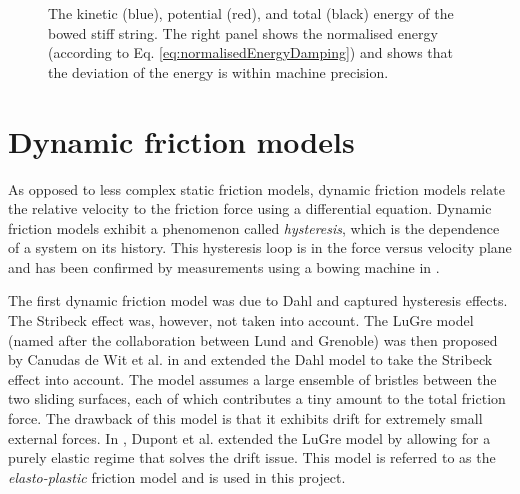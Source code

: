 \begin{figure}[h]
    \centering
      \caption{The kinetic (blue), potential (red), and total (black) energy of the bowed stiff string. The right panel shows the normalised energy (according to Eq. \eqref{eq:normalisedEnergyDamping}) and shows that the deviation of the energy is within machine precision. \label{fig:energyStaticBow}}
\end{figure}

\section{Dynamic friction models}
As opposed to less complex static friction models, dynamic friction models relate the relative velocity to the friction force using a differential equation. Dynamic friction models exhibit a phenomenon called \textit{hysteresis}, which is the dependence of a system on its history. This hysteresis loop is in the force versus velocity plane and has been confirmed by measurements using a bowing machine in \cite{Woodhouse2003}.

The first dynamic friction model was due to Dahl \cite{Dahl1968} and captured hysteresis effects. The Stribeck effect was, however, not taken into account. The LuGre model (named after the collaboration between Lund and Grenoble) was then proposed by Canudas de Wit et al. in \cite{Canudas1993, Canudas1995} and extended the Dahl model to take the Stribeck effect into account. The model assumes a large ensemble of bristles between the two sliding surfaces, each of which contributes a tiny amount to the total friction force. The drawback of this model is that it exhibits drift for extremely small external forces. In \cite{Dupont2002}, Dupont et al. extended the LuGre model by allowing for a purely elastic regime that solves the drift issue. This model is referred to as the \textit{elasto-plastic} friction model and is used in this project.

